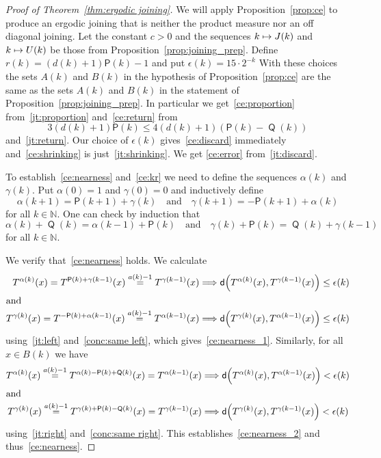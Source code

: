 \documentclass[AHL,Unicode,longabstracts,published]{cedram}
\DeclareMathOperator{\Q}{\mathsf{Q}}
\newcommand{\N}{\mathbb{N}}
\newcommand{\metric}{\mathsf{d}}
\renewcommand{\P}{\mathsf{P}}
\let\originalleft\left
\let\originalright\right
\renewcommand{\left}{\mathopen{}\mathclose\bgroup\originalleft}
\renewcommand{\right}{\aftergroup\egroup\originalright}
\let\oldmapsto\mapsto
\renewcommand*{\mapsto}{\mathchoice{\longmapsto}{\oldmapsto}{\oldmapsto}{\oldmapsto}}
\renewcommand*{\implies}{\mathchoice{\Longrightarrow}{\Rightarrow}{\Rightarrow}{\Rightarrow}}
\begin{document}
\begin{proof}[Proof of Theorem~\ref{thm:ergodic joining}]
We will apply Proposition~\ref{prop:ce} to produce an ergodic joining that is neither the product measure nor an off diagonal joining. Let the constant $c > 0$ and the sequences $k \mapsto J(k)$ and $k \mapsto U(k)$ be those from Proposition~\ref{prop:joining_prep}. Define $r(k) = (d(k)+1) \P(k) -1$ and put $\epsilon(k) = 15 \cdot 2^{-k}$ With these choices the sets $A(k)$ and $B(k)$ in the hypothesis of Proposition~\ref{prop:ce} are the same as the sets $A(k)$ and $B(k)$ in the statement of Proposition~\ref{prop:joining_prep}. In particular we get~\eqref{ce:proportion} from~\eqref{jt:proportion} and~\eqref{ce:return} from
\[
3(d(k)+1) \P(k) \le 4(d(k)+1) (\P(k) - \Q(k))
\]
and~\eqref{jt:return}. Our choice of $\epsilon(k)$ gives~\eqref{ce:discard} immediately and~\eqref{ce:shrinking} is just~\eqref{jt:shrinking}. We get \eqref{ce:error} from~\eqref{jt:discard}.

To establish~\eqref{ce:nearness} and~\eqref{ce:kr} we need to define the sequences $\alpha(k)$ and $\gamma(k)$. Put $\alpha(0) = 1$ and $\gamma(0) = 0$ and inductively define
\[
\alpha(k+1) = \P(k+1) + \gamma(k)
\quad\text{and}\quad
\gamma(k+1) = - \P(k+1) + \alpha(k)
\]
for all $k \in \N$. One can check by induction that
\begin{equation}\label{eqn:joining_tower_relations}
\alpha(k) + \Q(k) = \alpha(k-1) + \P(k)
\quad\text{and}\quad
\gamma(k) + \P(k) = \Q(k) + \gamma(k-1)
\end{equation}
for all $k \in \N$.

We verify that~\eqref{ce:nearness} holds. We calculate
\begin{align*}
T^{\alpha(k)}(x) = T^{\P(k) + \gamma(k-1)}(x) \overset{a(k)-1}{=} T^{\gamma(k-1)}(x)
&\implies
\metric\left(T^{\alpha(k)}(x), T^{\gamma(k-1)}(x)\right) \le \epsilon(k)
\\
\intertext{and}
T^{\gamma(k)}(x) = T^{-\P(k) + \alpha(k-1)}(x) \overset{a(k)-1}{=} T^{\alpha(k-1)}(x)
&\implies
\metric\left(T^{\gamma(k)}(x), T^{\alpha(k-1)}(x)\right) \le \epsilon(k)
\end{align*}
using~\eqref{jt:left} and~\eqref{conc:same left}, which gives~\eqref{ce:nearness_1}. Similarly, for all $x \in B(k)$ we have
\begin{align*}
T^{\alpha(k)}(x) \overset{a(k)-1}{=} T^{\alpha(k) - \P(k) + \Q(k)}(x) = T^{\alpha(k-1)}(x)
&\implies
\metric\left(T^{\alpha(k)}(x), T^{\alpha(k-1)}(x)\right) < \epsilon(k)
\\
\intertext{and}
T^{\gamma(k)}(x) \overset{a(k)-1}{=} T^{\gamma(k) + \P(k) - \Q(k)}(x) = T^{\gamma(k-1)}(x)
&\implies
\metric\left(T^{\gamma(k)}(x), T^{\gamma(k-1)}(x)\right) < \epsilon(k)
\end{align*}
using~\eqref{jt:right} and~\eqref{conc:same right}. This establishes~\eqref{ce:nearness_2} and thus~\eqref{ce:nearness}.%



\end{proof}
\end{document}
